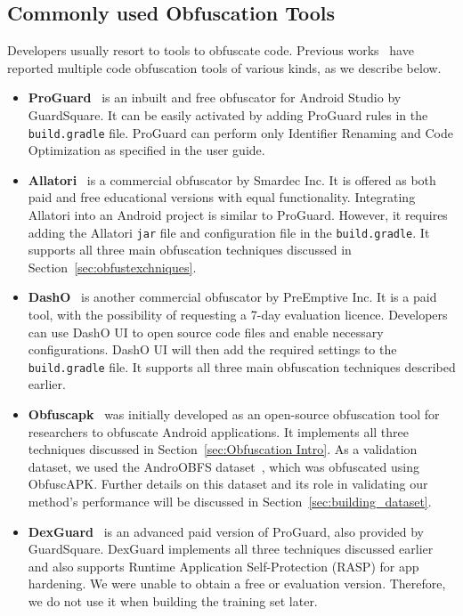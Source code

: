 \subsection{Commonly used Obfuscation Tools}
\label{sec:commontools}

Developers usually resort to tools to obfuscate code. Previous works~\cite{wang2017changed, dong2018understanding, mirzaei2019androdet, park2019framework} have reported multiple code obfuscation tools of various kinds, as we describe below.

\begin{itemize}

\item {\textbf{ProGuard}}~\cite{proguard} is an inbuilt and free obfuscator for Android Studio by GuardSquare. It can be easily activated by adding ProGuard rules in the \texttt{build.gradle} file. ProGuard can perform only Identifier Renaming and Code Optimization as specified in the user guide.


\item \textbf{Allatori}~\cite{allatori} is a commercial obfuscator by Smardec Inc. It is  offered as both paid and free educational versions with equal functionality. Integrating Allatori into an Android project is similar to ProGuard. However, it requires adding the Allatori \texttt{jar} file and configuration file in the \texttt{build.gradle}. It supports all three main obfuscation techniques discussed in Section~\ref{sec:obfustexchniques}.

    
\item \textbf{DashO}~\cite{dasho} is another commercial obfuscator by PreEmptive Inc. It is a paid tool, with the possibility of requesting a 7-day evaluation licence. Developers can use DashO UI to open source code files and enable necessary configurations. DashO UI will then add the required settings to the \texttt{build.gradle} file. It supports all three main obfuscation techniques described earlier.


\item \textbf{Obfuscapk}~\cite{obfuscapk} was initially developed as an open-source obfuscation tool for researchers to obfuscate Android applications. It implements all three techniques discussed in Section~\ref{sec:Obfuscation Intro}. As a validation dataset, we used the AndroOBFS dataset~\cite{androobfs}, which was obfuscated using ObfuscAPK. Further details on this dataset and its role in validating our method's performance will be discussed in Section~\ref{sec:building_dataset}.


\item \textbf{DexGuard}~\cite{dexguard} is an advanced paid version of ProGuard, also provided by GuardSquare. DexGuard implements all three techniques discussed earlier and also supports Runtime Application Self-Protection (RASP) for app hardening. We were unable to obtain a free or evaluation version. Therefore, we do not use it when building the training set later.

\end{itemize}

